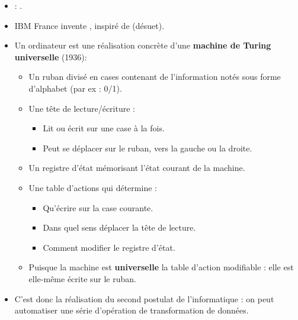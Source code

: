\begin{slide}
	\begin{itemize}
		\item {}: .
		\item IBM France invente , inspiré de  (désuet).
	\end{itemize}
\end{slide}

\begin{slide}
	\begin{itemize}
		\item Un ordinateur est une réalisation concrète d'une \textbf{machine de Turing universelle} (1936):
			\begin{itemize}
				\item Un ruban divisé en cases contenant de l'information notés sous forme d'alphabet (par ex : 0/1).
				\item Une tête de lecture/écriture :
					\begin{itemize}
						\item Lit ou écrit sur une case à la fois.
						\item Peut se déplacer sur le ruban, vers la gauche ou la droite.
					\end{itemize}
				\item Un registre d'état mémorisant l'état courant de la machine.
				\item Une table d'actions qui détermine :
					\begin{itemize}
						\item Qu'écrire sur la case courante.
						\item Dans quel sens déplacer la tête de lecture.
						\item Comment modifier le registre d'état.
					\end{itemize}
				\item Puisque la machine est \textbf{universelle} la table d'action modifiable : elle est elle-même écrite sur le ruban.
			\end{itemize}
	
		\item C'est donc la réalisation du second postulat de l'informatique : on peut automatiser une série d'opération de transformation de données.
	\end{itemize}
\end{slide}

